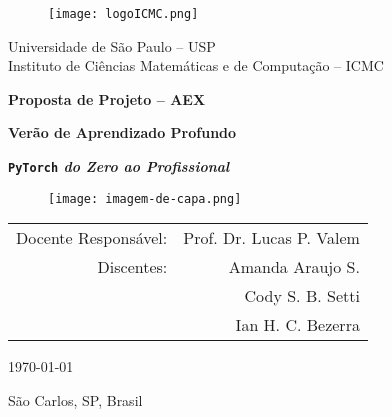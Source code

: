 \begin{titlepage}
    \clearpage\thispagestyle{empty}
	\centering

	\begin{figure}[ht]
		\centering
		\texttt{[image: logoICMC.png]}
	\end{figure}
	
	{\normalsize Universidade de São Paulo -- USP \\
		Instituto de Ciências Matemáticas e de Computação -- ICMC
		\par}
	\vspace*{2cm}
	
	{\Large\bfseries Proposta de Projeto -- AEX\par}
	\vspace*{8mm}
	{\Huge\bfseries Verão de Aprendizado Profundo \par}
	\vspace*{2mm}
	{\LARGE\bfseries \texttt{PyTorch} \emph{do Zero ao Profissional} \par}
	\vspace*{5mm}
	
    \begin{figure}[h!]
        \centering
        \texttt{[image: imagem-de-capa.png]}
    \end{figure}
	\vspace*{5mm}

	\begin{tabular}{rr}
        Docente Responsável: & Prof. Dr. Lucas P. Valem \\
        Discentes: & Amanda Araujo S. \\
		& Cody S. B. Setti \\
		& Ian H. C. Bezerra
	\end{tabular}
	\vspace*{1.25cm}
	   
	\vfill  %

	{\normalsize \today \par}
	\vspace*{2mm}
	{\normalsize São Carlos, SP, Brasil \par}
	\vspace*{2.5cm}
\end{titlepage}